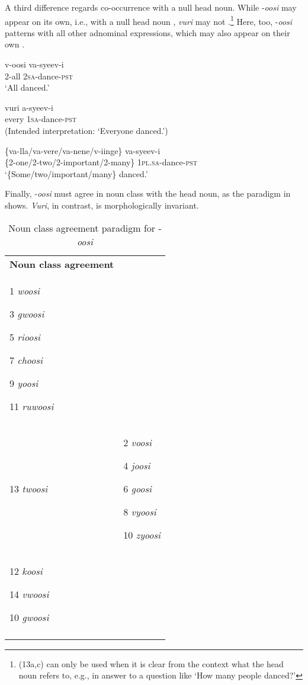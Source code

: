 \documentclass[output=paper]{langsci/langscibook}
\begin{document}
  A third difference regards co-occurrence with a null head noun. While -\textit{oosi} may appear on its own, i.e., with a null head noun , \textit{vuri} may not .\footnote{ (13a,c) can only be used when it is clear from the context what the head noun refers to, e.g., in answer to a question like ‘How many people danced?’
} Here, too, -\textit{oosi} patterns with all other adnominal expressions, which may also appear on their own .

\ea
\gll v-oosi    va-syeev-i      \\
     2-all    2\textsc{sa}{}-dance-\textsc{pst}\\
\glt ‘All danced.’
\z

\ea
\gll *vuri    a-syeev-i  \\
     every    1\textsc{sa}{}-dance-\textsc{pst}\\
\glt (Intended interpretation: ‘Everyone danced.’)
\z

\ea
\gll \{va-lla/va-vere/va-nene/v-iinge\}  va-syeev-i\\
     \{2-one/2-two/2-important/2-many\}  1\textsc{pl}.\textsc{sa}{}-dance-\textsc{pst}\\
\glt ‘\{Some/two/important/many\} danced.’
\z

  Finally, -\textit{oosi} must agree in noun class with the head noun, as the paradigm in  shows. \textit{Vuri}, in contrast, is morphologically invariant.

\begin{table}
\caption{Noun class agreement paradigm for -\textit{oosi}}
\label{tab:1}


\begin{tabularx}{\textwidth}{XX}
\lsptoprule
\hhline{-~}
{\bfseries Noun class agreement} & \\
1  \textit{woosi}

3  \textit{gwoosi}  

5  \textit{rioosi}

7  \textit{choosi}

9  \textit{yoosi}

11  \textit{ruwoosi}\\
13  \textit{twoosi} & 2  \textit{voosi}

4  \textit{joosi}

6  \textit{goosi}

8  \textit{vyoosi}

10  \textit{zyoosi}\\
12  \textit{koosi}    

14  \textit{vwoosi}

10  \textit{gwoosi}\\
\lspbottomrule
\end{tabularx}
\end{table}
\end{document}
